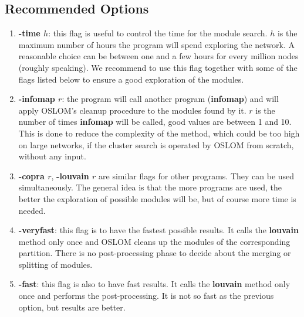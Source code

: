 \documentclass[11pt]{article}
\begin{document}
  \subsection{ {Recommended Options}}
  
   
  \begin{enumerate}
  
    \item \textbf{-time $h$}:  this flag is useful to control the time for the module search. $h$ is the maximum number of hours the program will spend exploring the network. A reasonable choice can be between one and a few hours for every million nodes (roughly speaking). We recommend to use this flag together with some of the flags listed below to ensure a good exploration of the modules.

   \item \textbf{-infomap $r$}: the program will call another program
     (\textbf{infomap}) and will apply OSLOM's cleanup procedure
     to the modules found by it. $r$ is the number of times \textbf{infomap} will be called, good values are between 1 and 10.
    This is done to reduce the complexity of the method, which 
    could be too high on large networks, if the cluster search is operated by OSLOM from scratch,
    without any input.
    
   \item \textbf{-copra $r$}, \textbf{-louvain $r$} are similar flags
     for other programs. They can be used simultaneously. The general
     idea is that the more programs are used, the better the
     exploration of possible modules will be, but of course more time is needed.
   
    \item \textbf{-veryfast}: this flag is to have the fastest
      possible results. It calls the \textbf{louvain} method only once
      and OSLOM cleans up the modules of the corresponding
      partition. There is no post-processing phase to decide about the merging
      or splitting of modules.
        
      \item \textbf{-fast}: this flag is also to have fast results. It
        calls the \textbf{louvain} method only once and 
        performs the post-processing. It is not so fast as the previous option, but results are better.

    

   
   \end{enumerate}
   
   
   
\end{document}
